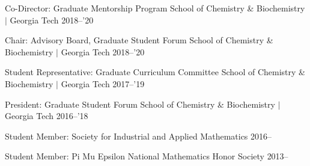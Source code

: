 



\begin{cvservices}

  \cvservice
    {Co-Director: Graduate Mentorship Program} %
    {} %
    {School of Chemistry \& Biochemistry $\vert$ Georgia Tech} %
    {2018--'20} %

  \cvservice
    {Chair: Advisory Board, Graduate Student Forum} %
    {} %
    {School of Chemistry \& Biochemistry $\vert$ Georgia Tech} %
    {2018--'20} %

  \cvservice
    {Student Representative: Graduate Curriculum Committee} %
    {} %
    {School of Chemistry \& Biochemistry $\vert$ Georgia Tech} %
    {2017--'19} %

  \cvservice
    {President: Graduate Student Forum} %
    {} %
    {School of Chemistry \& Biochemistry $\vert$ Georgia Tech} %
    {2016--'18} %

  \cvservice
    {Student Member: Society for Industrial and Applied Mathematics} %
    {} %
    {} %
    {2016--} %

%
%
%
  \cvservice
    {Student Member: Pi Mu Epsilon National Mathematics Honor Society} %
    {} %
    {} %
    {2013--} %


\end{cvservices}
